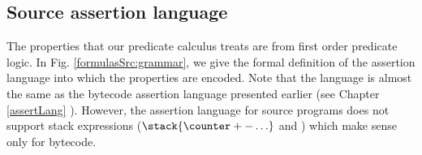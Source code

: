 
\subsection{Source assertion language} \label{formulasSrc}
The properties that our predicate calculus treats are from first order predicate logic.
In Fig. \ref{formulasSrc:grammar}, we give the formal definition of the assertion language into which 
the properties are encoded. Note that the language is almost the same as the bytecode assertion 
language presented earlier (see Chapter \ref{assertLang} ). However, the assertion language for source programs
 does not support  stack expressions ($\stack{\counter + - \ldots}$ and \counter) which make sense only for bytecode.  


